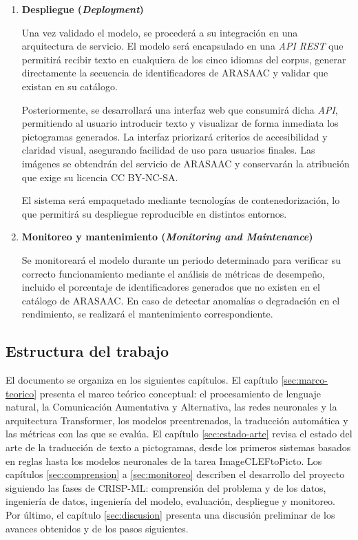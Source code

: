 \begin{enumerate}
    \item \textbf{Despliegue (\textit{Deployment})}

    Una vez validado el modelo, se procederá a su integración en una arquitectura de servicio. El modelo será encapsulado en una \textit{API REST} que permitirá recibir texto en cualquiera de los cinco idiomas del corpus, generar directamente la secuencia de identificadores de ARASAAC y validar que existan en su catálogo.

    Posteriormente, se desarrollará una interfaz web que consumirá dicha \textit{API}, permitiendo al usuario introducir texto y visualizar de forma inmediata los pictogramas generados. La interfaz priorizará criterios de accesibilidad y claridad visual, asegurando facilidad de uso para usuarios finales. Las imágenes se obtendrán del servicio de ARASAAC y conservarán la atribución que exige su licencia CC BY-NC-SA.

    El sistema será empaquetado mediante tecnologías de contenedorización, lo que permitirá su despliegue reproducible en distintos entornos.

    \item \textbf{Monitoreo y mantenimiento (\textit{Monitoring and Maintenance})}

    Se monitoreará el modelo durante un periodo determinado para verificar su correcto funcionamiento mediante el análisis de métricas de desempeño, incluido el porcentaje de identificadores generados que no existen en el catálogo de ARASAAC. En caso de detectar anomalías o degradación en el rendimiento, se realizará el mantenimiento correspondiente.

\end{enumerate}

\subsection{Estructura del trabajo}

El documento se organiza en los siguientes capítulos. El capítulo \ref{sec:marco-teorico} presenta el marco teórico conceptual: el procesamiento de lenguaje natural, la Comunicación Aumentativa y Alternativa, las redes neuronales y la arquitectura Transformer, los modelos preentrenados, la traducción automática y las métricas con las que se evalúa. El capítulo \ref{sec:estado-arte} revisa el estado del arte de la traducción de texto a pictogramas, desde los primeros sistemas basados en reglas hasta los modelos neuronales de la tarea ImageCLEFtoPicto. Los capítulos \ref{sec:comprension} a \ref{sec:monitoreo} describen el desarrollo del proyecto siguiendo las fases de CRISP-ML: comprensión del problema y de los datos, ingeniería de datos, ingeniería del modelo, evaluación, despliegue y monitoreo. Por último, el capítulo \ref{sec:discusion} presenta una discusión preliminar de los avances obtenidos y de los pasos siguientes.
